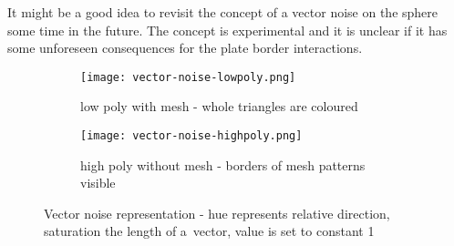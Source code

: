 It might be a good idea to revisit the concept of a vector noise on the sphere some time in the future. The concept is experimental and it is unclear if it has some unforeseen consequences for the plate border interactions.
\begin{figure}[ht]
\centering
\begin{subfigure}{7cm}
\texttt{[image: vector-noise-lowpoly.png]}
\caption{low poly with mesh - whole triangles are coloured}
\label{fig:vector-noise-lowpoly}
\end{subfigure}
\hspace*{1cm}
\begin{subfigure}{7cm}
\texttt{[image: vector-noise-highpoly.png]}
\caption{high poly without mesh - borders of mesh patterns visible}
\label{fig:vector-noise-highpoly}
\end{subfigure}
\caption{Vector noise representation - hue represents relative direction, saturation the length of a~vector, value is set to constant 1}
\label{fig:vector-noise}
\end{figure}
